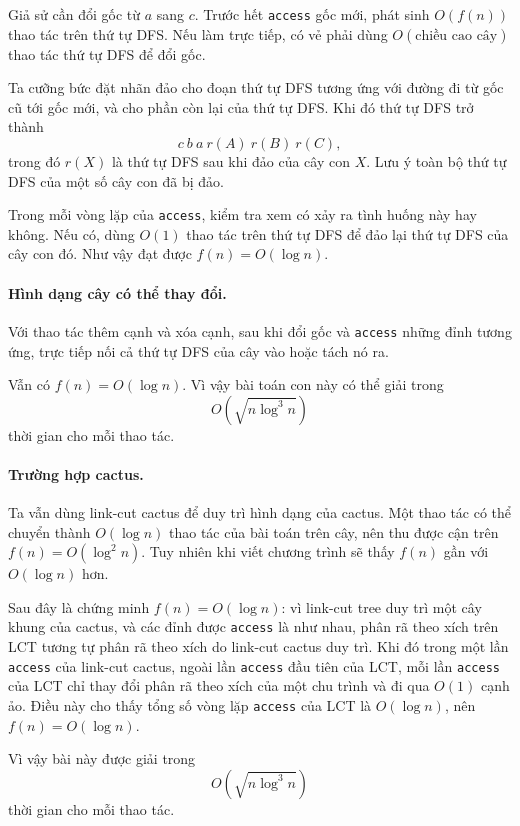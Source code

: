 \documentclass[11pt]{article}
\begin{document}
Giả sử cần đổi gốc từ \(a\) sang \(c\). Trước hết \texttt{access} gốc mới, phát
sinh \(O(f(n))\) thao tác trên thứ tự DFS. Nếu làm trực tiếp, có vẻ phải dùng
\(O(\text{chiều cao cây})\) thao tác thứ tự DFS để đổi gốc.

Ta cưỡng bức đặt nhãn đảo cho đoạn thứ tự DFS tương ứng với đường đi từ gốc cũ
tới gốc mới, và cho phần còn lại của thứ tự DFS. Khi đó thứ tự DFS trở thành
\[
  c\ b\ a\ r(A)\ r(B)\ r(C),
\]
trong đó \(r(X)\) là thứ tự DFS sau khi đảo của cây con \(X\). Lưu ý toàn bộ
thứ tự DFS của một số cây con đã bị đảo.

Trong mỗi vòng lặp của \texttt{access}, kiểm tra xem có xảy ra tình huống này
hay không. Nếu có, dùng \(O(1)\) thao tác trên thứ tự DFS để đảo lại thứ tự DFS
của cây con đó. Như vậy đạt được \(f(n)=O(\log n)\).

\paragraph{Hình dạng cây có thể thay đổi.}
Với thao tác thêm cạnh và xóa cạnh, sau khi đổi gốc và \texttt{access} những
đỉnh tương ứng, trực tiếp nối cả thứ tự DFS của cây vào hoặc tách nó ra.

Vẫn có \(f(n)=O(\log n)\). Vì vậy bài toán con này có thể giải trong
\[
  O\left(\sqrt{n\log^3 n}\right)
\]
thời gian cho mỗi thao tác.

\paragraph{Trường hợp cactus.}
Ta vẫn dùng link-cut cactus để duy trì hình dạng của cactus. Một thao tác có
thể chuyển thành \(O(\log n)\) thao tác của bài toán trên cây, nên thu được
cận trên \(f(n)=O(\log^2 n)\). Tuy nhiên khi viết chương trình sẽ thấy
\(f(n)\) gần với \(O(\log n)\) hơn.

Sau đây là chứng minh \(f(n)=O(\log n)\): vì link-cut tree duy trì một cây
khung của cactus, và các đỉnh được \texttt{access} là như nhau, phân rã theo
xích trên LCT tương tự phân rã theo xích do link-cut cactus duy trì. Khi đó
trong một lần \texttt{access} của link-cut cactus, ngoài lần \texttt{access}
đầu tiên của LCT, mỗi lần \texttt{access} của LCT chỉ thay đổi phân rã theo
xích của một chu trình và đi qua \(O(1)\) cạnh ảo. Điều này cho thấy tổng số
vòng lặp \texttt{access} của LCT là \(O(\log n)\), nên \(f(n)=O(\log n)\).

Vì vậy bài này được giải trong
\[
  O\left(\sqrt{n\log^3 n}\right)
\]
thời gian cho mỗi thao tác.
\end{document}
